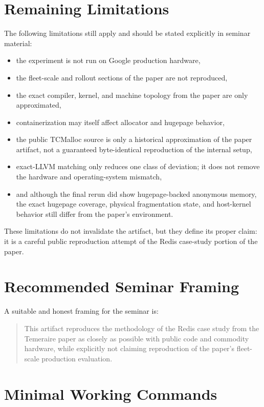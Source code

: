\documentclass[a4paper,11pt]{article}
\begin{document}
\section{Remaining Limitations}

The following limitations still apply and should be stated explicitly in seminar material:

\begin{itemize}[leftmargin=1.5em]
  \item the experiment is not run on Google production hardware,
  \item the fleet-scale and rollout sections of the paper are not reproduced,
  \item the exact compiler, kernel, and machine topology from the paper are only approximated,
  \item containerization may itself affect allocator and hugepage behavior,
  \item the public TCMalloc source is only a historical approximation of the paper artifact, not a guaranteed byte-identical reproduction of the internal setup,
  \item exact-LLVM matching only reduces one class of deviation; it does not
  remove the hardware and operating-system mismatch,
  \item and although the final rerun did show hugepage-backed anonymous memory,
  the exact hugepage coverage, physical fragmentation state, and host-kernel
  behavior still differ from the paper's environment.
\end{itemize}

These limitations do not invalidate the artifact, but they define its proper claim: it is a careful public reproduction attempt of the Redis case-study portion of the paper.

\section{Recommended Seminar Framing}

A suitable and honest framing for the seminar is:

\begin{quote}
This artifact reproduces the methodology of the Redis case study from the Temeraire paper as closely as possible with public code and commodity hardware, while explicitly not claiming reproduction of the paper's fleet-scale production evaluation.
\end{quote}

\section{Minimal Working Commands}
\end{document}
